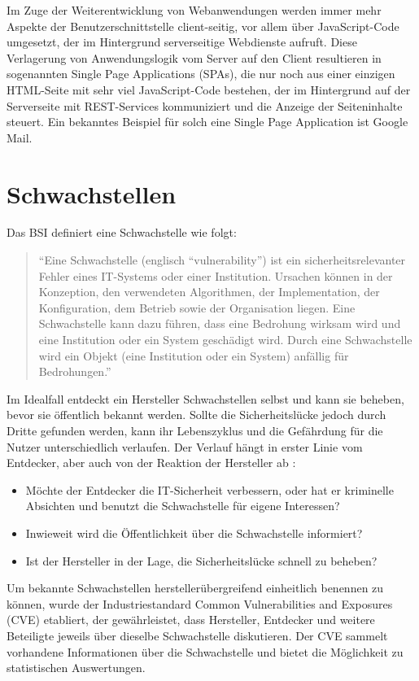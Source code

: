 \documentclass[12pt,oneside,a4paper,parskip,pointlessnumbers]{scrbook}
\begin{document}
  Im Zuge der Weiterentwicklung von Webanwendungen werden immer mehr Aspekte der Benutzerschnittstelle client-seitig, vor allem über JavaScript-Code umgesetzt, der im Hintergrund serverseitige Webdienste aufruft.
  Diese Verlagerung von Anwendungslogik vom Server auf den Client resultieren in sogenannten Single Page Applications (SPAs), die nur noch aus einer einzigen HTML-Seite mit sehr viel JavaScript-Code bestehen, der im Hintergrund auf der Serverseite mit REST-Services kommuniziert und die Anzeige der Seiteninhalte steuert. Ein bekanntes Beispiel für solch eine Single Page Application ist Google Mail.
  \cite{Rohr}
  \newpage

 \section{Schwachstellen}
  Das BSI definiert eine Schwachstelle wie folgt:

  \begin{quote}``Eine Schwachstelle (englisch ``vulnerability'') ist ein sicherheitsrelevanter Fehler eines IT-Systems oder einer Institution. Ursachen können in der Konzeption, den verwendeten Algorithmen, der Implementation, der Konfiguration, dem Betrieb sowie der Organisation liegen. Eine Schwachstelle kann dazu führen, dass eine Bedrohung wirksam wird und eine Institution oder ein System geschädigt wird. Durch eine Schwachstelle wird ein Objekt (eine Institution oder ein System) anfällig für Bedrohungen.'' \cite[S.107]{BSI2}
  \end{quote}

  Im Idealfall entdeckt ein Hersteller Schwachstellen selbst und kann sie beheben, bevor sie öffentlich bekannt werden. Sollte die Sicherheitslücke jedoch durch Dritte gefunden werden, kann ihr Lebenszyklus und die Gefährdung für die Nutzer unterschiedlich verlaufen. Der Verlauf hängt in erster Linie vom Entdecker, aber auch von der Reaktion der Hersteller ab \cite{BSI3}:
  \begin{itemize}
    \item Möchte der Entdecker die IT-Sicherheit verbessern, oder hat er kriminelle Absichten und benutzt die Schwachstelle für eigene Interessen?
    \item Inwieweit wird die Öffentlichkeit über die Schwachstelle informiert?
    \item Ist der Hersteller in der Lage, die Sicherheitslücke schnell zu beheben?
  \end{itemize}
Um bekannte Schwachstellen herstellerübergreifend einheitlich benennen zu können, wurde der Industriestandard Common Vulnerabilities and Exposures (CVE) etabliert, der gewährleistet, dass Hersteller, Entdecker und weitere Beteiligte jeweils über dieselbe Schwachstelle diskutieren. Der CVE sammelt vorhandene Informationen über die Schwachstelle und bietet die Möglichkeit zu statistischen Auswertungen.
\end{document}
